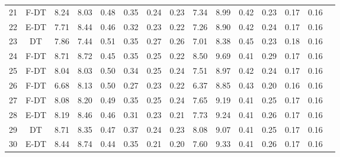 \begin{longtable}{@{\hskip3pt}c@{\hskip3pt}c@{\hskip3pt}c@{\hskip3pt}c@{\hskip3pt}c@{\hskip3pt}c@{\hskip3pt}c@{\hskip3pt}c@{\hskip3pt}c@{\hskip3pt}c@{\hskip3pt}c@{\hskip3pt}c@{\hskip3pt}c@{\hskip3pt}c@{\hskip3pt}c}
         21 &           F-DT &              8.24 &        8.03 &          0.48 &        0.35 &        0.24 &         0.23 &                7.34 &        8.99 &          0.42 &        0.23 &        0.17 &         0.16 \\
         22 &           E-DT &              7.71 &        8.44 &          0.46 &        0.32 &        0.23 &         0.22 &                7.26 &        8.90 &          0.42 &        0.24 &        0.17 &         0.16 \\
         23 &             DT &              7.86 &        7.44 &          0.51 &        0.35 &        0.27 &         0.26 &                7.01 &        8.38 &          0.45 &        0.23 &        0.18 &         0.16 \\
         24 &           F-DT &              8.71 &        8.72 &          0.45 &        0.35 &        0.25 &         0.22 &                8.50 &        9.69 &          0.41 &        0.29 &        0.17 &         0.16 \\
         25 &           F-DT &              8.04 &        8.03 &          0.50 &        0.34 &        0.25 &         0.24 &                7.51 &        8.97 &          0.42 &        0.24 &        0.17 &         0.16 \\
         26 &           F-DT &              6.68 &        8.13 &          0.50 &        0.27 &        0.23 &         0.22 &                6.37 &        8.85 &          0.43 &        0.20 &        0.16 &         0.16 \\
         27 &           F-DT &              8.08 &        8.20 &          0.49 &        0.35 &        0.25 &         0.24 &                7.65 &        9.19 &          0.41 &        0.25 &        0.17 &         0.16 \\
         28 &           E-DT &              8.19 &        8.46 &          0.46 &        0.31 &        0.23 &         0.21 &                7.73 &        9.24 &          0.41 &        0.26 &        0.17 &         0.16 \\
         29 &             DT &              8.71 &        8.35 &          0.47 &        0.37 &        0.24 &         0.23 &                8.08 &        9.07 &          0.41 &        0.25 &        0.17 &         0.16 \\
         30 &           E-DT &              8.44 &        8.74 &          0.44 &        0.35 &        0.21 &         0.20 &                7.60 &        9.33 &          0.41 &        0.26 &        0.17 &         0.16 \\

\end{longtable}
